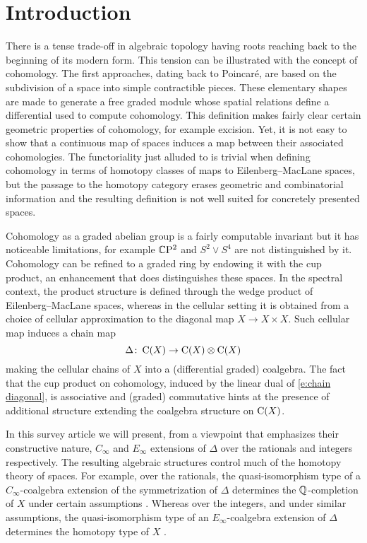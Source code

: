 
\section{Introduction} \label{s:introduction}

There is a tense trade-off in algebraic topology having roots reaching back to the beginning of its modern form.
This tension can be illustrated with the concept of cohomology.
The first approaches, dating back to Poincar\'e, are based on the subdivision of a space into simple contractible pieces.
These elementary shapes are made to generate a free graded module whose spatial relations define a differential used to compute cohomology.
This definition makes fairly clear certain geometric properties of cohomology, for example excision.
Yet, it is not easy to show that a continuous map of spaces induces a map between their associated cohomologies.
The functoriality just alluded to is trivial when defining cohomology in terms of homotopy classes of maps to Eilenberg--MacLane spaces, but the passage to the homotopy category erases geometric and combinatorial information and the resulting definition is not well suited for concretely presented spaces.

Cohomology as a graded abelian group is a fairly computable invariant but it has noticeable limitations, for example $\mathbb{C} \mathrm{P}^2$ and $S^2 \vee S^4$ are not distinguished by it.
Cohomology can be refined to a graded ring by endowing it with the cup product, an enhancement that does distinguishes these spaces.
In the spectral context, the product structure is defined through the wedge product of Eilenberg--MacLane spaces, whereas in the cellular setting it is obtained from a choice of cellular approximation to the diagonal map $X \to X \times X$.
Such cellular map induces a chain map
\begin{equation} \label{e:chain diagonal}
	\Delta \colon \operatorname{C}(X) \to \operatorname{C}(X) \otimes \operatorname{C}(X)
\end{equation}
making the cellular chains of $X$ into a (differential graded) coalgebra.
The fact that the cup product on cohomology, induced by the linear dual of \eqref{e:chain diagonal}, is associative and (graded) commutative hints at the presence of additional structure extending the coalgebra structure on $\operatorname{C}(X)$.

In this survey article we will present, from a viewpoint that emphasizes their constructive nature, $C_\infty$ and $E_\infty$ extensions of $\Delta$ over the rationals and integers respectively.
The resulting algebraic structures control much of the homotopy theory of spaces.
For example, over the rationals, the quasi-isomorphism type of a $C_\infty$-coalgebra extension of the symmetrization of $\Delta$ determines the $\mathbb{Q}$-completion of $X$ under certain assumptions \cite{quillen1969rational, buijs2020liemodels}.
Whereas over the integers, and under similar assumptions, the quasi-isomorphism type of an $E_\infty$-coalgebra extension of $\Delta$ determines the homotopy type of $X$ \cite{mandell2006homotopy_type}.

